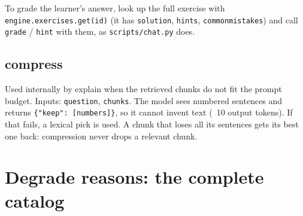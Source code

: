 \documentclass[11pt,a4paper]{article}
\renewcommand{\_}{\origus\allowbreak}
\begin{document}
To grade the learner's answer, look up the full exercise with \texttt{engine.exercises.get(id)} (it has
\texttt{solution}, \texttt{hints}, \texttt{common\_mistakes}) and call \texttt{grade} / \texttt{hint} with them, as
\texttt{scripts/chat.py} does.

\subsection{compress}

Used internally by explain when the retrieved chunks do not fit the prompt budget. Inputs:
\texttt{question}, \texttt{chunks}. The model sees numbered sentences and returns \texttt{\{"keep": [numbers]\}}, so it
cannot invent text (~10 output tokens). If that fails, a lexical pick is used. A chunk that loses
all its sentences gets its best one back: compression never drops a relevant chunk.

\section{Degrade reasons: the complete catalog}
\label{sec:degrade}
\end{document}
